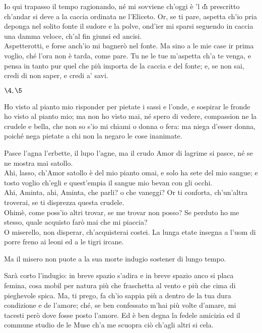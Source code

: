 \documentclass{book}
\begin{document}
	\3 Io qui trapasso il tempo ragionando,
	n\'e mi sovviene ch'oggi \`e 'l d\`{\i} prescritto
	ch'andar si deve a la caccia ordinata
	ne l'Eliceto. Or, se ti pare, aspetta
	ch'io pria deponga nel solito fonte
	il sudore e la polve, ond'ier mi sparsi
	seguendo in caccia una damma veloce,
	ch'al fin giunsi ed ancisi. \\

   \2 Aspetterotti,
	e forse anch'io mi bagner\`o nel fonte.
	Ma sino a le mie case ir prima voglio,
	ch\'e l'ora non \`e tarda, come pare.
	Tu ne le tue m'aspetta ch'a te venga,
	e pensa in tanto pur quel che pi\`u importa
	de la caccia e del fonte; e, se non sai,
	credi di non saper, e credi a' savi.


\Scena

\(\4, \5\)

	\4 Ho visto al pianto mio
	risponder per pietate i sassi e l'onde,
	e sospirar le fronde
	ho visto al pianto mio;
	ma non ho visto mai,
	n\'e spero di vedere,
	compassion ne la crudele e bella,
	che non so s'io mi chiami o donna o fera:
	ma niega d'esser donna,
	poich\'e nega pietate
	a chi non la negaro
	le cose inanimate.

	\5 Pasce l'agna l'erbette, il lupo l'agne,
	ma il crudo Amor di lagrime si pasce,
	n\'e se ne mostra mai satollo. \\

   \4 Ahi, lasso,
	ch'Amor satollo \`e del mio pianto omai,
	e solo ha sete del mio sangue; e tosto
	voglio ch'egli e quest'empia il sangue mio
	bevan con gli occhi. \\

   \5 Ahi, Aminta, ahi, Aminta,
	che parli? o che vaneggi? Or ti conforta,
	ch'un'altra troverai, se ti disprezza
	questa crudele. \\

   \4 Ohim\`e, come poss'io
	altri trovar, se me trovar non posso?
	Se perduto ho me stesso, quale acquisto
	far\`o mai che mi piaccia? \\

   \5 O miserello,
	non disperar, ch'acquisterai costei.
	La lunga etate insegna a l'uom di porre
	freno ai leoni ed a le tigri ircane.

	\4 Ma il misero non puote a la sua morte
	indugio sostener di lungo tempo.

	\5 Sar\`a corto l'indugio: in breve spazio
	s'adira e in breve spazio anco si placa
	femina, cosa mobil per natura
	pi\`u che fraschetta al vento e pi\`u che cima
	di pieghevole spica. Ma, ti prego,
	fa ch'io sappia pi\`u a dentro de la tua
	dura condizione e de l'amore;
	ch\'e, se ben confessato m'hai pi\`u volte
	d'amare, mi tacesti per\`o dove
	fosse posto l'amore. Ed \`e ben degna
	la fedele amicizia ed il commune
	studio de le Muse ch'a me scuopra
	ci\`o ch'agli altri si cela. \\
\end{document}
